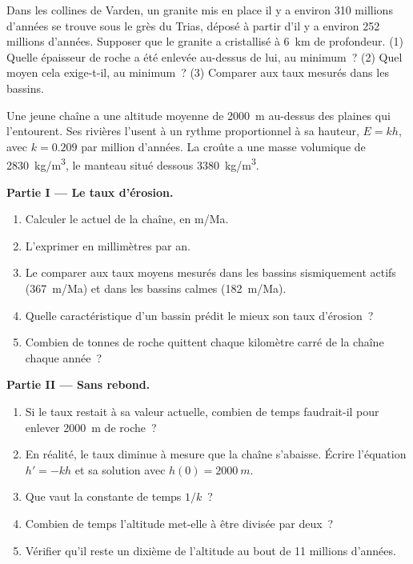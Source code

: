 \begin{exercise}[$\star\star\star$]\label{exo:g12:destruction-of-mountains:15}
Dans les collines de Varden, un granite mis en place il y a environ 310
millions d'années se trouve sous le grès du Trias, déposé à partir d'il y a
environ 252 millions d'années. Supposer que le granite a cristallisé à
\qty{6}{km} de profondeur. (1) Quelle épaisseur de roche a été enlevée
au-dessus de lui, au minimum~? (2) Quel  moyen cela
exige-t-il, au minimum~? (3) Comparer aux taux mesurés dans les bassins.
\end{exercise}

\begin{problem}
\label{pb:g12:destruction-of-mountains:1}
Une jeune chaîne a une altitude moyenne de \qty{2000}{m} au-dessus des
plaines qui l'entourent. Ses rivières l'usent à un rythme proportionnel à
sa hauteur, $E = kh$, avec $k = 0.209$ par million d'années. La croûte a
une masse volumique de \qty{2830}{kg/m^3}, le manteau situé dessous
\qty{3380}{kg/m^3}.

\medskip
\noindent\textbf{Partie I --- Le taux d'érosion.}
\begin{enumerate}
  \item Calculer le  actuel de la chaîne, en \unit{m/Ma}.
  \item L'exprimer en millimètres par an.
  \item Le comparer aux taux moyens mesurés dans les bassins sismiquement
        actifs (\qty{367}{m/Ma}) et dans les bassins calmes
        (\qty{182}{m/Ma}).
  \item Quelle caractéristique d'un bassin prédit le mieux son taux
        d'érosion~?
  \item Combien de tonnes de roche quittent chaque kilomètre carré de la
        chaîne chaque année~?
\end{enumerate}

\medskip
\noindent\textbf{Partie II --- Sans rebond.}
\begin{enumerate}[resume]
  \item Si le taux restait à sa valeur actuelle, combien de temps
        faudrait-il pour enlever \qty{2000}{m} de roche~?
  \item En réalité, le taux diminue à mesure que la chaîne s'abaisse.
        Écrire l'équation $h' = -kh$ et sa solution avec
        $h(0) = \qty{2000}{m}$.
  \item Que vaut la constante de temps $1/k$~?
  \item Combien de temps l'altitude met-elle à être divisée par deux~?
  \item Vérifier qu'il reste un dixième de l'altitude au bout de 11
        millions d'années.
\end{enumerate}


\end{problem}
